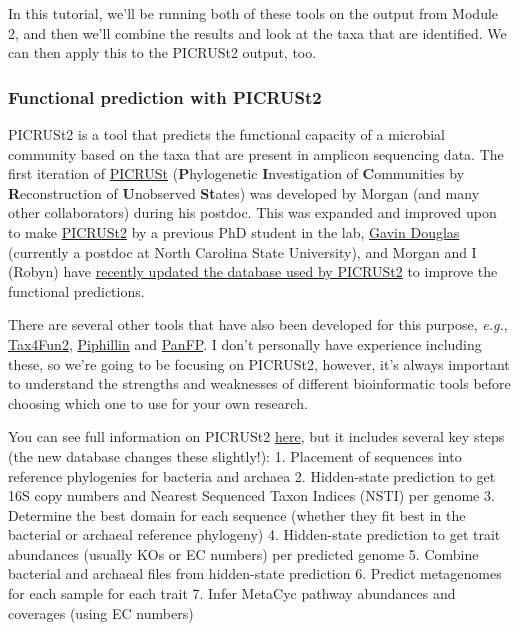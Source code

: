 \documentclass[
]{book}
\begin{document}
In this tutorial, we'll be running both of these tools on the output from Module 2, and then we'll combine the results and look at the taxa that are identified. We can then apply this to the PICRUSt2 output, too.

\subsubsection{Functional prediction with PICRUSt2}\label{functional-prediction-with-picrust2}

PICRUSt2 is a tool that predicts the functional capacity of a microbial community based on the taxa that are present in amplicon sequencing data. The first iteration of \href{https://www.nature.com/articles/nbt.2676}{PICRUSt} (\textbf{P}hylogenetic \textbf{I}nvestigation of \textbf{C}ommunities by \textbf{R}econstruction of \textbf{U}nobserved \textbf{St}ates) was developed by Morgan (and many other collaborators) during his postdoc. This was expanded and improved upon to make \href{https://www.nature.com/articles/s41587-020-0548-6}{PICRUSt2} by a previous PhD student in the lab, \href{https://www.gavindouglas.ca/}{Gavin Douglas} (currently a postdoc at North Carolina State University), and Morgan and I (Robyn) have \href{https://academic.oup.com/bioinformatics/article/41/5/btaf269/8121151}{recently updated the database used by PICRUSt2} to improve the functional predictions.

There are several other tools that have also been developed for this purpose, \emph{e.g.}, \href{https://environmentalmicrobiome.biomedcentral.com/articles/10.1186/s40793-020-00358-7}{Tax4Fun2}, \href{https://bmcgenomics.biomedcentral.com/articles/10.1186/s12864-019-6427-1}{Piphillin} and \href{https://bmcresnotes.biomedcentral.com/articles/10.1186/s13104-015-1462-8}{PanFP}. I don't personally have experience including these, so we're going to be focusing on PICRUSt2, however, it's always important to understand the strengths and weaknesses of different bioinformatic tools before choosing which one to use for your own research.

You can see full information on PICRUSt2 \href{https://github.com/picrust/picrust2/wiki}{here}, but it includes several key steps (the new database changes these slightly!):
1. Placement of sequences into reference phylogenies for bacteria and archaea
2. Hidden-state prediction to get 16S copy numbers and Nearest Sequenced Taxon Indices (NSTI) per genome
3. Determine the best domain for each sequence (whether they fit best in the bacterial or archaeal reference phylogeny)
4. Hidden-state prediction to get trait abundances (usually KOs or EC numbers) per predicted genome
5. Combine bacterial and archaeal files from hidden-state prediction
6. Predict metagenomes for each sample for each trait
7. Infer MetaCyc pathway abundances and coverages (using EC numbers)
\end{document}
